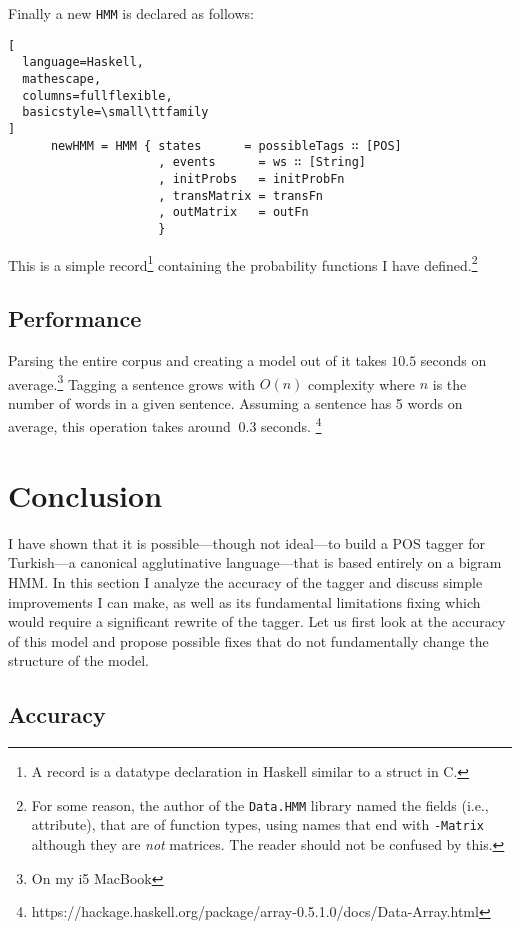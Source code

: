 \documentclass{article}
\begin{document}
Finally a new \texttt{HMM} is declared as follows:
\begin{lstlisting}[
  language=Haskell,
  mathescape,
  columns=fullflexible,
  basicstyle=\small\ttfamily
]
      newHMM = HMM { states      = possibleTags ∷ [POS]
                     , events      = ws ∷ [String]
                     , initProbs   = initProbFn
                     , transMatrix = transFn
                     , outMatrix   = outFn
                     }
\end{lstlisting}

This is a simple record\footnote{A record is a datatype declaration in Haskell
  similar to a struct in C.} containing the probability functions I have
defined.\footnote{For some reason, the author of the \texttt{Data.HMM} library
  named the fields (i.e., attribute), that are of function types, using names
  that end with \texttt{-Matrix} although they are \emph{not} matrices. The
  reader should not be confused by this.}



\subsection{Performance}
Parsing the entire corpus and creating a model out of it takes $10.5$ seconds on
average.\footnote{On my i5 MacBook} Tagging a sentence grows with $O(n)$
complexity where $n$ is the number of words in a given sentence. Assuming a
sentence has 5 words on average, this operation takes around $~0.3$ seconds.
\footnote{https://hackage.haskell.org/package/array-0.5.1.0/docs/Data-Array.html}

\section{Conclusion}

I have shown that it is possible---though not ideal---to build a POS tagger for
Turkish---a canonical agglutinative language---that is based entirely on a
bigram HMM. In this section I analyze the accuracy of the tagger and discuss
simple improvements I can make, as well as its fundamental limitations fixing
which would require a significant rewrite of the tagger. Let us first look at
the accuracy of this model and propose possible fixes that do not fundamentally
change the structure of the model.

\subsection{Accuracy}
\label{subsec:accuracy}
\end{document}
